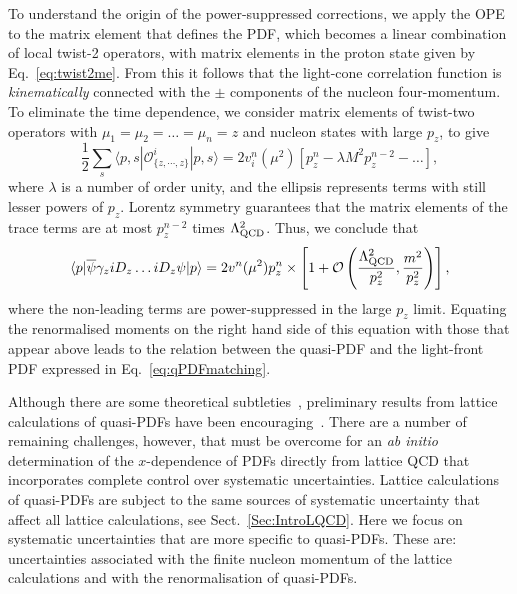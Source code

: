 To understand the origin of the power-suppressed corrections, we apply the OPE 
to the matrix element that defines the PDF, which becomes a linear combination 
of local twist-2 operators, with matrix elements in the proton state given 
by Eq.~\eqref{eq:twist2me}. 
%
From this it follows that the light-cone correlation function is 
{\it kinematically} connected with the $\pm$ components of the nucleon 
four-momentum. 
%
To eliminate the time dependence, we consider matrix elements of twist-two 
operators with $\mu_1=\mu_2=\dots=\mu_n=z$ and nucleon states with large $p_z$, 
to give
\begin{equation}
\frac{1}{2} \sum_s \langle p,s|\mathcal{O}^i_{\{z,\cdots,z\}}|p,s\rangle 
= 2v_i^n(\mu^2)\left[p_z^n-\lambda M^2 p_z^{n-2}-\dots\right], 
\end{equation}
where $\lambda$ is a number of order unity, and the ellipsis represents terms
with still lesser powers of $p_z$.
%
Lorentz symmetry guarantees that the matrix elements of the trace terms 
are at most $p_z^{n-2}$ times $\Lambda^2_{\rm QCD}$. 
%
Thus, we conclude that
\begin{equation}
 \langle p| {\overline \psi}\gamma_ziD_z\dots iD_z \psi|p\rangle
 = 2v^n(\mu^2) p_z^n\times \left[ 1 + {\cal O}\left(\frac{\Lambda^2_{\rm QCD}}{p_z^2},  
 \frac{m^2}{p_z^2}\right)\right],
\end{equation}
where the non-leading terms are power-suppressed in the large $p_z$ limit. 
%
Equating the renormalised moments on the right hand side of this equation with 
those that appear above leads to the relation between the quasi-PDF and the 
light-front PDF expressed in Eq.~\eqref{eq:qPDFmatching}.

Although there are some theoretical subtleties~\cite{Rossi:2017muf,Ji:2017rah}, 
preliminary results from lattice calculations of quasi-PDFs have been 
encouraging~\cite{Lin:2014zya,Alexandrou:2015rja,Chen:2016utp,
Alexandrou:2016jqi}. 
%
There are a number of remaining challenges, however, that must be overcome 
for an {\it ab initio} determination of the $x$-dependence of PDFs directly 
from lattice QCD that incorporates complete control over systematic 
uncertainties. 
%
Lattice calculations of quasi-PDFs are subject to the same sources of 
systematic uncertainty that affect all lattice calculations, see
Sect.~\ref{Sec:IntroLQCD}. 
%
Here we focus on systematic uncertainties that are more specific to quasi-PDFs. 
%
These are: uncertainties associated with the finite nucleon momentum of the 
lattice calculations and with the renormalisation of quasi-PDFs.


